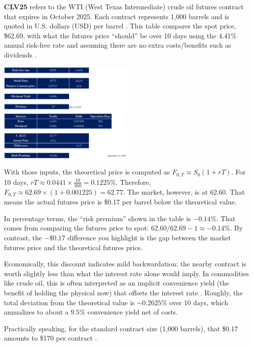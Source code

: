 \documentclass[10pt,a4paper]{article} %
\begin{document}
\textbf{CLV25} refers to the WTI (West Texas Intermediate) crude oil futures contract that expires in October 2025. Each contract represents 1{,}000 barrels and is quoted in U.S. dollars (USD) per barrel \citep{cme_cl_specs,cme_cl_calendar}.
This table compares the spot price, \$62.69, with what the futures price “should” be over 10 days using the 4.41\% annual risk-free rate and assuming there are no extra costs/benefits such as dividends \citep{frbny_sofr}.

\begin{center}
\includegraphics[width=0.5\textwidth]{figures/wti.png}
\end{center}

With those inputs, the theoretical price is computed as $F_{0,T} \approx S_0(1 + rT)$. For 10 days, $rT \approx 0.0441 \times \frac{10}{360} = 0.1225\%$. Therefore, $F_{0,T} \approx 62.69 \times (1 + 0.001225) = 62.77$. The market, however, is at 62.60. That means the actual futures price is \$0.17 per barrel below the theoretical value.

In percentage terms, the “risk premium” shown in the table is $-0.14\%$. That comes from comparing the futures price to spot: $62.60/62.69 - 1 \approx -0.14\%$. By contrast, the $-\$0.17$ difference you highlight is the gap between the market futures price and the theoretical futures price.

Economically, this discount indicates mild backwardation: the nearby contract is worth slightly less than what the interest rate alone would imply. In commodities like crude oil, this is often interpreted as an implicit convenience yield (the benefit of holding the physical now) that offsets the interest rate \citep{kaldor_working_brennan, eia_backwardation_2013, milonas_convenience_2024}. Roughly, the total deviation from the theoretical value is $\sim 0.2625\%$ over 10 days, which annualizes to about a $9.5\%$ convenience yield net of costs.

Practically speaking, for the standard contract size (1{,}000 barrels), that \$0.17 amounts to \$170 per contract \citep{cme_cl_specs}.
\end{document}
